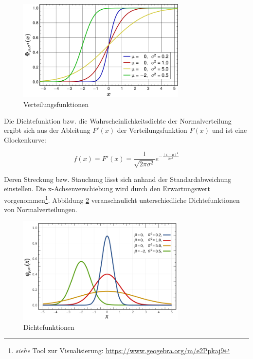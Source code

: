 \begin{figure}[H]
\centering
\includegraphics[width=0.75\textwidth]{img/Verteilungskurven.png}
\caption[Verteilungsfunktionen]{Verteilungsfunktionen\protect\footnotemark}
\label{fig:verteilungskurven}
\end{figure}

Die Dichtefunktion bzw. die Wahrscheinlichkeitsdichte der Normalverteilung ergibt sich aus der Ableitung $F'(x)$ der Verteilungsfunktion $F(x)$ und ist eine Glockenkurve:

\begin{equation}
f(x) = F'(x) = \frac{1}{\sqrt{2 \pi \sigma^2}} e^{-\frac{(x-\mu)^2}{2 \sigma^2}}
\end{equation}

Deren Streckung bzw. Stauchung lässt sich anhand der Standardabweichung einstellen. Die x-Achsenverschiebung wird durch den Erwartungswert vorgenommen\footnote{\textit{siehe} Tool zur Visualisierung: \url{https://www.geogebra.org/m/e2Ppkaj9}}. Abbildung \ref{fig:glockenkurven} veranschaulicht unterschiedliche Dichtefunktionen von Normalverteilungen.

\begin{figure}[H]
\centering
\includegraphics[width=0.75\textwidth]{img/Glockenkurven.png}
\caption[Dichtefunktionen]{Dichtefunktionen\protect\footnotemark}
\label{fig:glockenkurven}
\end{figure}

